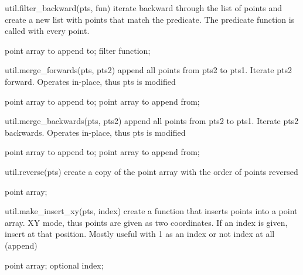 \begin{APIfunc}{util.filter\_backward(pts, fun)}
    iterate backward through the list of points and create a new list with points that match the predicate. The predicate function is called with every point.
    \begin{APIparameters}
            point array to append to;
            filter function;
    \end{APIparameters}
\end{APIfunc}
\begin{APIfunc}{util.merge\_forwards(pts, pts2)}
    append all points from pts2 to pts1. Iterate pts2 forward. Operates in-place, thus pts is modified
    \begin{APIparameters}
            point array to append to;
            point array to append from;
    \end{APIparameters}
\end{APIfunc}
\begin{APIfunc}{util.merge\_backwards(pts, pts2)}
    append all points from pts2 to pts1. Iterate pts2 backwards. Operates in-place, thus pts is modified
    \begin{APIparameters}
            point array to append to;
            point array to append from;
    \end{APIparameters}
\end{APIfunc}
\begin{APIfunc}{util.reverse(pts)}
    create a copy of the point array with the order of points reversed
    \begin{APIparameters}
            point array;
    \end{APIparameters}
\end{APIfunc}
\begin{APIfunc}{util.make\_insert\_xy(pts, index)}
    create a function that inserts points into a point array. XY mode, thus points are given as two coordinates. If an index is given, insert at that position. Mostly useful with 1 as an index or not index at all (append)
    \begin{APIparameters}
            point array;
            optional index;
    \end{APIparameters}
\end{APIfunc}
